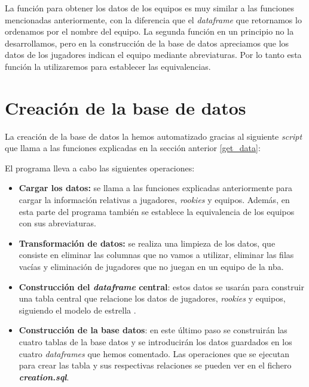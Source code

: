 \documentclass[11pt]{diazessay} %
\begin{document}
La función para obtener los datos de los equipos es muy similar a las funciones mencionadas anteriormente, con la diferencia que el \textit{dataframe} que retornamos lo ordenamos por el nombre del equipo. La segunda función en un principio no la desarrollamos, pero en la construcción de la base de datos apreciamos que los datos de los jugadores indican el equipo mediante abreviaturas. Por lo tanto esta función la utilizaremos para establecer las equivalencias.

\section*{Creación de la base de datos}
La creación de la base de datos la hemos automatizado gracias al siguiente \textit{script} que llama a las funciones explicadas en la sección anterior \ref{get_data}:


El programa lleva a cabo las siguientes operaciones:
\begin{itemize}
	\item \textbf{Cargar los datos:} se llama a las funciones explicadas anteriormente para cargar la información relativas a jugadores, \textit{rookies} y equipos.  Además, en esta parte del programa también se establece la equivalencia de los equipos con sus abreviaturas.
	\item \textbf{Transformación de datos:} se realiza una limpieza de los datos, que consiste en eliminar las columnas que no vamos a utilizar, eliminar las filas vacías y eliminación de jugadores que no juegan en un equipo de la nba.
	\item \textbf{Construcción del \textit{dataframe} central}: estos datos se usarán para construir una tabla central que relacione los datos de jugadores, \textit{rookies} y equipos, siguiendo el modelo de estrella \cite{estrella}.
	\item \textbf{Construcción de la base datos}: en este último paso se construirán las cuatro tablas de la base datos y se introducirán los datos guardados en los cuatro \textit{dataframes} que hemos comentado. Las operaciones que se ejecutan para crear las tabla y sus respectivas relaciones se pueden ver en el fichero \textit{\textbf{creation.sql}}.


\end{itemize}
\end{document}
